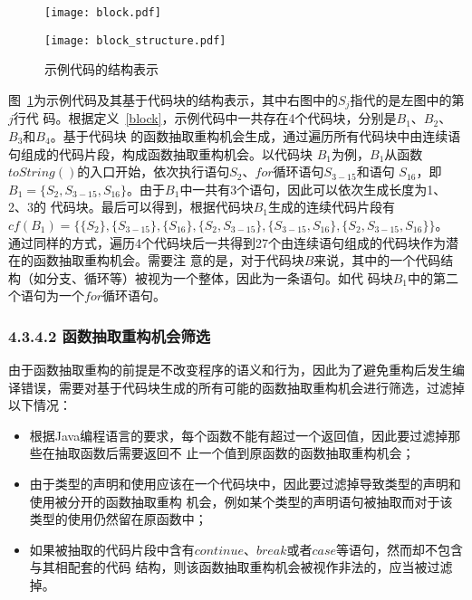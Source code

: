 \begin{figure} 
  \centering 
  \begin{minipage}[c]{0.5\textwidth} 
    \centering 
    \texttt{[image: block.pdf]} 
  \end{minipage}%
  \begin{minipage}[c]{0.5\textwidth} 
    \centering 
    \texttt{[image: block\_structure.pdf]} 
  \end{minipage} 
\caption{示例代码的结构表示}
\label{block-example}
\end{figure}

图~\ref{block-example}为示例代码及其基于代码块的结构表示，其中右图中的$S_j$指代的是左图中的第$j$行代
码。根据定义~\ref{block}，示例代码中一共存在4个代码块，分别是$B_1$、$B_2$、$B_3$和$B_4$。基于代码块
的函数抽取重构机会生成，通过遍历所有代码块中由连续语句组成的代码片段，构成函数抽取重构机会。以代码块
$B_1$为例，$B_1$从函数$toString()$的入口开始，依次执行语句$S_2$、$for$循环语句$S_{3-15}$和语句
$S_{16}$，即$B_1=\{S_2,S_{3-15},S_{16}\}$。由于$B_1$中一共有3个语句，因此可以依次生成长度为1、2、3的
代码块。最后可以得到，根据代码块$B_1$生成的连续代码片段有
$cf(B_1)=\{\{S_2\},\{S_{3-15}\},\{S_{16}\},\{S_2,S_{3-15}\},\{S_{3-15},S_{16}\},\{S_2,S_{3-15},S_{16}\}\}$。
通过同样的方式，遍历4个代码块后一共得到27个由连续语句组成的代码块作为潜在的函数抽取重构机会。需要注
意的是，对于代码块$B$来说，其中的一个代码结构（如分支、循环等）被视为一个整体，因此为一条语句。如代
码块$B_1$中的第二个语句为一个$for$循环语句。

\subsubsection{4.3.4.2 函数抽取重构机会筛选}
由于函数抽取重构的前提是不改变程序的语义和行为，因此为了避免重构后发生编译错误，需要对基于代码块生成的所有可能的函数抽取重构机会进行筛选，过滤掉以下情况：
\begin{itemize}
  \item 根据Java编程语言的要求，每个函数不能有超过一个返回值，因此要过滤掉那些在抽取函数后需要返回不
  止一个值到原函数的函数抽取重构机会；
  \item 由于类型的声明和使用应该在一个代码块中，因此要过滤掉导致类型的声明和使用被分开的函数抽取重构
  机会，例如某个类型的声明语句被抽取而对于该类型的使用仍然留在原函数中；
  \item 如果被抽取的代码片段中含有$continue$、$break$或者$case$等语句，然而却不包含与其相配套的代码
  结构，则该函数抽取重构机会被视作非法的，应当被过滤掉。
\end{itemize}

